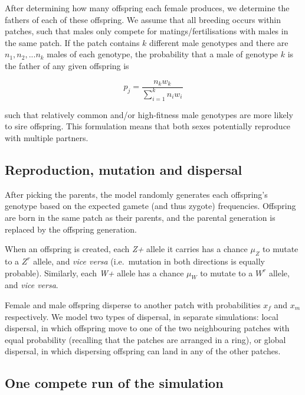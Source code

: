 \documentclass[]{rsos}%
\begin{document}
After determining how many offspring each female produces, we determine
the fathers of each of these offspring. We assume that all breeding
occurs within patches, such that males only compete for
matings/fertilisations with males in the same patch. If the patch
contains \(k\) different male genotypes and there are
\(n_1, n_2, ... n_k\) males of each genotype, the probability that a
male of genotype \(k\) is the father of any given offspring is

\[p_j = \frac{n_{k}w_k}{\sum_{i=1}^{k}n_{i}w_i}\]

such that relatively common and/or high-fitness male genotypes are more
likely to sire offspring. This formulation means that both sexes
potentially reproduce with multiple partners.

\hypertarget{reproduction-mutation-and-dispersal}{%
\subsection{Reproduction, mutation and
dispersal}\label{reproduction-mutation-and-dispersal}}

After picking the parents, the model randomly generates each offspring's
genotype based on the expected gamete (and thus zygote) frequencies.
Offspring are born in the same patch as their parents, and the parental
generation is replaced by the offspring generation.

When an offspring is created, each \emph{Z+} allele it carries has a
chance \(\mu_Z\) to mutate to a \(Z^r\) allele, and \emph{vice versa}
(i.e.~mutation in both directions is equally probable). Similarly, each
\emph{W+} allele has a chance \(\mu_W\) to mutate to a \(W^r\) allele,
and \emph{vice versa}.

Female and male offspring disperse to another patch with probabilities
\(x_f\) and \(x_m\) respectively. We model two types of dispersal, in
separate simulations: local dispersal, in which offspring move to one of
the two neighbouring patches with equal probability (recalling that the
patches are arranged in a ring), or global dispersal, in which
dispersing offspring can land in any of the other patches.

\hypertarget{one-compete-run-of-the-simulation}{%
\subsection{One compete run of the
simulation}\label{one-compete-run-of-the-simulation}}
\end{document}
